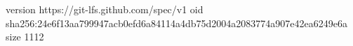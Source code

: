 version https://git-lfs.github.com/spec/v1
oid sha256:24e6f13aa799947acb0efd6a84114a4db75d2004a2083774a907e42ea6249e6a
size 1112

